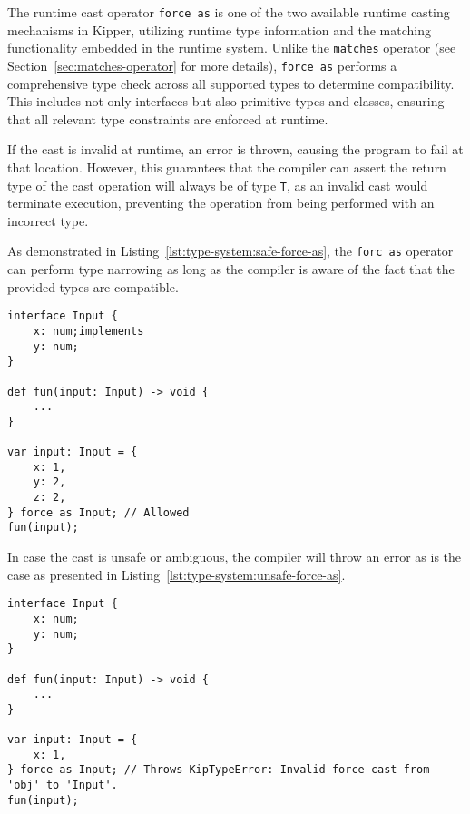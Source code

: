 The runtime cast operator \lstinline|force as| is one of the two available runtime casting mechanisms in Kipper, utilizing runtime type information and the matching functionality embedded in the runtime system. Unlike the \lstinline|matches| operator (see Section~\ref{sec:matches-operator} for more details), \lstinline|force as| performs a comprehensive type check across all supported types to determine compatibility. This includes not only interfaces but also primitive types and classes, ensuring that all relevant type constraints are enforced at runtime.

If the cast is invalid at runtime, an error is thrown, causing the program to fail at that location. However, this guarantees that the compiler can assert the return type of the cast operation will always be of type \lstinline|T|, as an invalid cast would terminate execution, preventing the operation from being performed with an incorrect type.

As demonstrated in Listing~\ref{lst:type-system:safe-force-as}, the \lstinline|forc as| operator can perform type narrowing as long as the compiler is aware of the fact that the provided types are compatible.

\begin{lstlisting}[language=Kipper,caption=Correctly casting an object to an interface using the \lstinline|force as| operator,label=lst:type-system:safe-force-as]
interface Input {
	x: num;implements
	y: num;
}

def fun(input: Input) -> void {
	...
}

var input: Input = {
	x: 1,
	y: 2,
	z: 2,
} force as Input; // Allowed
fun(input);
\end{lstlisting}

In case the cast is unsafe or ambiguous, the compiler will throw an error as is the case as presented in Listing~\ref{lst:type-system:unsafe-force-as}.

\begin{lstlisting}[language=Kipper,caption=Incorrectly casting an object to an interface using the \lstinline|force as| operator resulting in a runtime error,label=lst:type-system:unsafe-force-as]
interface Input {
	x: num;
	y: num;
}

def fun(input: Input) -> void {
	...
}

var input: Input = {
	x: 1,
} force as Input; // Throws KipTypeError: Invalid force cast from 'obj' to 'Input'.
fun(input);
\end{lstlisting}

